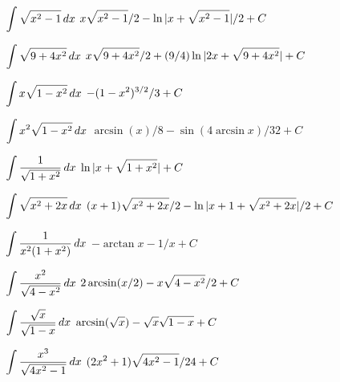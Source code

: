 \exercise $\displaystyle\int\sqrt{x^2-1}\,dx$
\answer $\displaystyle x\sqrt{x^2-1}/2-\ln|x+\sqrt{x^2-1}|/2+C$
\endanswer
\endexercise

\exercise $\displaystyle\int\sqrt{9+4x^2}\,dx$
\answer $\displaystyle x\sqrt{9+4x^2}/2+\hbox{$\displaystyle(9/4)\ln|2x+\sqrt{9+4x^2}|+C$}$
\endanswer
\endexercise

\exercise $\displaystyle\int x\sqrt{1-x^2}\,dx$
\answer $\displaystyle -(1-x^2)^{3/2}/3+C$
\endanswer
\endexercise

\exercise $\displaystyle\int x^2\sqrt{1-x^2}\,dx$
\answer $\arcsin(x)/8-\sin(4\arcsin x)/32+C$
\endanswer
\endexercise

\exercise $\displaystyle\int{1\over\sqrt{1+x^2}}\,dx$
\answer $\displaystyle \ln|x+\sqrt{1+x^2}|+C$
\endanswer
\endexercise

\exercise $\displaystyle\int\sqrt{x^2+2x}\,dx$
\answer $\displaystyle (x+1)\sqrt{x^2+2x}/2-\hbox{$\displaystyle\ln|x+1+\sqrt{x^2+2x}|/2+C$}$
\endanswer
\endexercise

\exercise $\displaystyle\int{1\over x^2(1+x^2)}\,dx$
\answer $-\arctan x - 1/x+C$
\endanswer
\endexercise

\exercise $\displaystyle\int{x^2\over\sqrt{4-x^2}}\,dx$
\answer $\displaystyle 2\arcsin(x/2)-x\sqrt{4-x^2}/2+C$
\endanswer
\endexercise

\exercise $\displaystyle\int{\sqrt{x}\over\sqrt{1-x}}\,dx$
\answer $\displaystyle \arcsin(\sqrt{x})-\sqrt{x}\sqrt{1-x}+C$
\endanswer
\endexercise

\exercise $\displaystyle\int{x^3\over\sqrt{4x^2-1}}\,dx$
\answer $\displaystyle (2x^2+1)\sqrt{4x^2-1}/24+C$
\endanswer

\endtwocol
\endexercise

\endexercises

